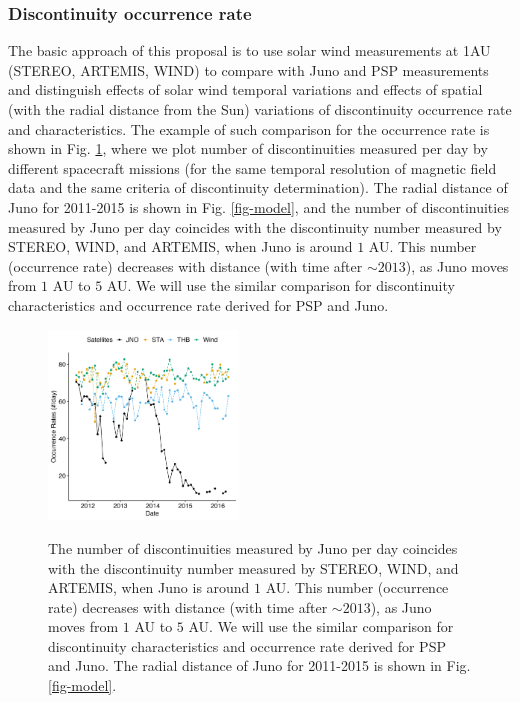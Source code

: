 \documentclass[
  letterpaper,
  DIV=11,
  numbers=noendperiod]{scrartcl}
\begin{document}
\subsubsection{Discontinuity occurrence
rate}\label{discontinuity-occurrence-rate}

The basic approach of this proposal is to use solar wind measurements at
1AU (STEREO, ARTEMIS, WIND) to compare with Juno and PSP measurements
and distinguish effects of solar wind temporal variations and effects of
spatial (with the radial distance from the Sun) variations of
discontinuity occurrence rate and characteristics. The example of such
comparison for the occurrence rate is shown in Fig. \ref{fig:rate},
where we plot number of discontinuities measured per day by different
spacecraft missions (for the same temporal resolution of magnetic field
data and the same criteria of discontinuity determination). The radial
distance of Juno for 2011-2015 is shown in Fig. \ref{fig-model}, and the
number of discontinuities measured by Juno per day coincides with the
discontinuity number measured by STEREO, WIND, and ARTEMIS, when Juno is
around \(1\) AU. This number (occurrence rate) decreases with distance
(with time after \(\sim 2013\)), as Juno moves from \(1\) AU to \(5\)
AU. We will use the similar comparison for discontinuity characteristics
and occurrence rate derived for PSP and Juno.

\begin{figure}
{\centering \includegraphics[width = 0.45\textwidth]{figures/ocr_time_cleaned.png}}
    \caption{The number of discontinuities measured by Juno per day coincides with the discontinuity number measured by STEREO, WIND, and ARTEMIS, when Juno is around $1$ AU. This number (occurrence rate) decreases with distance (with time after $\sim 2013$), as Juno moves from $1$ AU to $5$ AU. We will use the similar comparison for discontinuity characteristics and occurrence rate derived for PSP and Juno. The radial distance of Juno for 2011-2015 is shown in Fig. \ref{fig-model}.}
    \label{fig:rate}
\end{figure}
\end{document}
